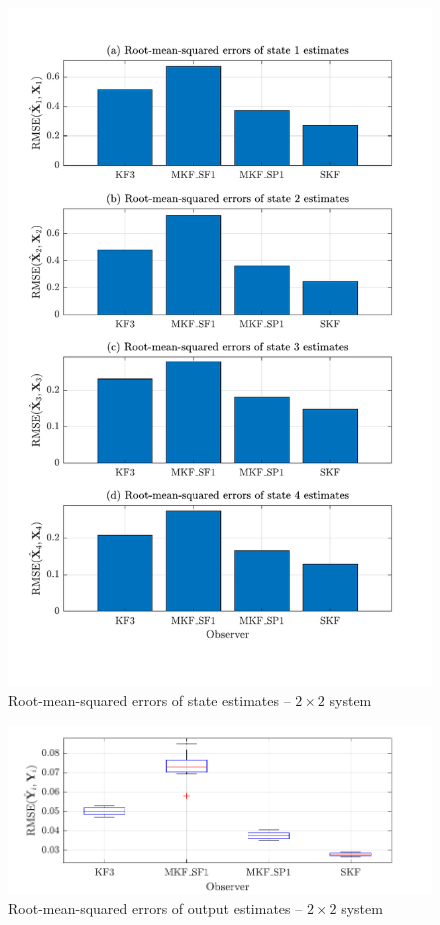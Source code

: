 \begin{figure}[htp]
	\centering
	\includegraphics[width=12cm]{images/rod_obs_sim2_all_seed_x_err_bar.pdf}
	\caption{Root-mean-squared errors of state estimates – $2\times2$ system}
	\label{fig:rod-obs-sim2-xest-RMSE-bar}
\end{figure}

\begin{figure}[htp]
	\centering
	\includegraphics[width=12cm]{images/rod_obs_sim2_all_seed_y_err_box.pdf}
	\caption{Root-mean-squared errors of output estimates – $2\times2$ system}
	\label{fig:rod-obs-sim2-yest-all-seed-RMSE-box}
\end{figure}

